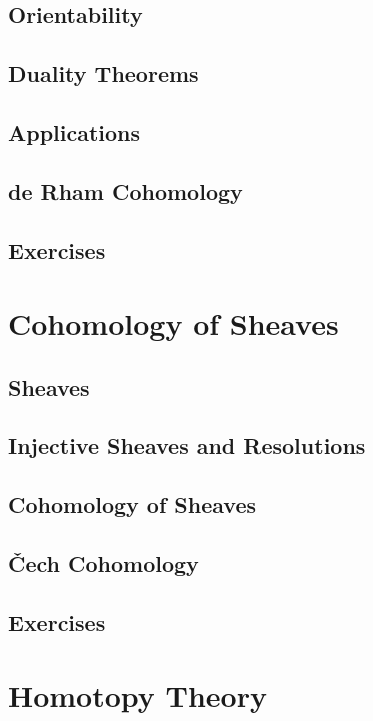 \subsection{Orientability}

\subsection{Duality Theorems}

\subsection{Applications}

\subsection{de Rham Cohomology}

\subsection{Exercises}

\section{Cohomology of Sheaves}

\subsection{Sheaves}

\subsection{Injective Sheaves and Resolutions}

\subsection{Cohomology of Sheaves}

\subsection{Čech Cohomology}

\subsection{Exercises}

\section{Homotopy Theory}

